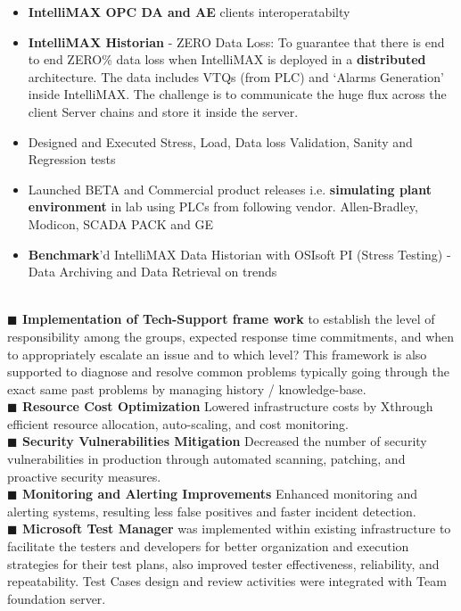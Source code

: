 \documentclass[]{cv-class}
\begin{document}
       \begin{itemize}
       \item  \textbf{IntelliMAX OPC DA and AE }clients interoperatabilty
       \item  \textbf{IntelliMAX Historian} - ZERO Data Loss: To guarantee that there is end to end ZERO\% data loss when IntelliMAX is deployed in a \textbf{distributed} architecture. The data includes VTQs (from PLC) and ‘Alarms Generation’ inside IntelliMAX. The challenge is to communicate the huge flux across the client Server chains and store it inside the server.
       \item  Designed and Executed Stress, Load, Data loss Validation, Sanity and Regression tests
       \item  Launched BETA and Commercial product releases i.e. \textbf{simulating plant environment} in lab using PLCs from following vendor. Allen-Bradley, Modicon, SCADA PACK and GE
       \item  \textbf{Benchmark}'d IntelliMAX Data Historian with OSIsoft PI (Stress Testing) - Data Archiving and Data Retrieval on trends
       \end{itemize}
   \\
         \textbf{$\blacksquare$ Implementation of Tech-Support frame work} to establish the level of responsibility among the groups, expected response time commitments, and when to appropriately escalate an issue and to which level? This framework is also supported to diagnose and resolve common problems typically going through the exact same past problems by managing history / knowledge-base.\\
       \textbf{$\blacksquare$ Resource Cost Optimization} Lowered infrastructure costs by Xthrough efficient resource allocation, auto-scaling, and cost monitoring.\\
   \textbf{$\blacksquare$ Security Vulnerabilities Mitigation} Decreased the number of security vulnerabilities in production through automated scanning, patching, and proactive security measures.\\
     \textbf{$\blacksquare$ Monitoring and Alerting Improvements} Enhanced monitoring and alerting systems, resulting less false positives and faster incident detection.\\
   \textbf{$\blacksquare$  Microsoft Test Manager} was implemented within existing infrastructure to facilitate the testers and developers for better organization and execution strategies for their test plans, also improved tester effectiveness, reliability, and repeatability. Test Cases design and review activities were integrated with Team foundation server.\\
\end{document}
